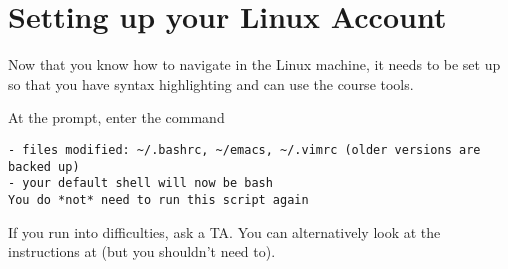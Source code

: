 \section*{Setting up your Linux Account}

Now that you know how to navigate in the Linux machine, it needs to be
set up so that you have syntax highlighting and can use the course tools.

\begin{part}
At the prompt, enter the command
\begin{lstlisting}[language={[coin]C},deletekeywords={do},basicstyle=\smallbasicstyle]
% /afs/andrew/course/15/122/bin/15122-setup.sh
- files modified: ~/.bashrc, ~/emacs, ~/.vimrc (older versions are backed up)
- your default shell will now be bash
You do *not* need to run this script again
\end{lstlisting}
If you run into difficulties, ask a TA\@.  You can alternatively look
at the instructions at
(but you shouldn't need to).
\end{part}
